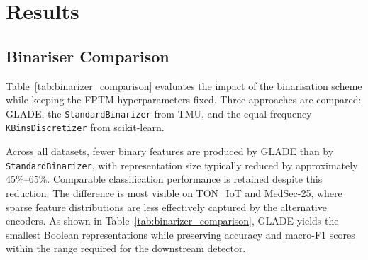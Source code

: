 \documentclass[journal,twoside,web]{ieeecolor}
\begin{document}
\section{Results}
\label{sec:results}

\subsection{Binariser Comparison}
\label{sec:res-binarisers}

Table~\ref{tab:binarizer_comparison} evaluates the impact of the
binarisation scheme while keeping the FPTM hyperparameters fixed.
Three approaches are compared: GLADE, the \texttt{StandardBinarizer}
from TMU, and the equal-frequency \texttt{KBinsDiscretizer} from
scikit-learn.

Across all datasets, fewer binary features are produced by GLADE than
by \texttt{StandardBinarizer}, with representation size typically
reduced by approximately 45\%--65\%. Comparable classification
performance is retained despite this reduction. The difference is most
visible on TON\_IoT and MedSec-25, where sparse feature distributions
are less effectively captured by the alternative encoders. As shown in
Table~\ref{tab:binarizer_comparison}, GLADE yields the smallest
Boolean representations while preserving accuracy and macro-F1 scores
within the range required for the downstream detector.

\begin{table}[t]
\centering
\renewcommand{\arraystretch}{1.2}
\small
\caption{Comparison of binarisation methods with $n_\text{bins}=15$.
Best values per dataset and metric are shown in \textbf{bold}; the
final column reports the method with the most favorable overall trade-off
(fewest bits at the highest accuracy and macro F1).}
\label{tab:binarizer_comparison}
\end{table}
\end{document}
